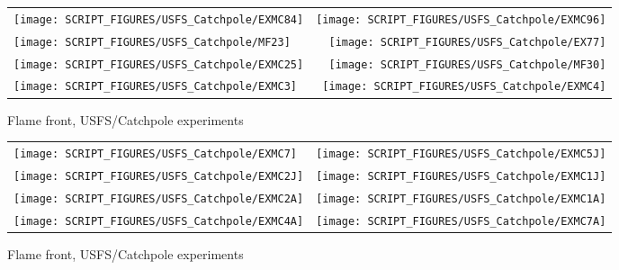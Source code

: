 \begin{figure}[p]
\begin{tabular*}{\textwidth}{l@{\extracolsep{\fill}}r}
\texttt{[image: SCRIPT\_FIGURES/USFS\_Catchpole/EXMC84]} &
\texttt{[image: SCRIPT\_FIGURES/USFS\_Catchpole/EXMC96]} \\
\texttt{[image: SCRIPT\_FIGURES/USFS\_Catchpole/MF23]} &
\texttt{[image: SCRIPT\_FIGURES/USFS\_Catchpole/EX77]} \\
\texttt{[image: SCRIPT\_FIGURES/USFS\_Catchpole/EXMC25]} &
\texttt{[image: SCRIPT\_FIGURES/USFS\_Catchpole/MF30]} \\
\texttt{[image: SCRIPT\_FIGURES/USFS\_Catchpole/EXMC3]} &
\texttt{[image: SCRIPT\_FIGURES/USFS\_Catchpole/EXMC4]} \\
\end{tabular*}
\caption[Flame front, USFS/Catchpole experiments]{Flame front, USFS/Catchpole experiments}
\label{USFS_Catchpole_296}
\end{figure}

\begin{figure}[p]
\begin{tabular*}{\textwidth}{l@{\extracolsep{\fill}}r}
\texttt{[image: SCRIPT\_FIGURES/USFS\_Catchpole/EXMC7]} &
\texttt{[image: SCRIPT\_FIGURES/USFS\_Catchpole/EXMC5J]} \\
\texttt{[image: SCRIPT\_FIGURES/USFS\_Catchpole/EXMC2J]} &
\texttt{[image: SCRIPT\_FIGURES/USFS\_Catchpole/EXMC1J]} \\
\texttt{[image: SCRIPT\_FIGURES/USFS\_Catchpole/EXMC2A]} &
\texttt{[image: SCRIPT\_FIGURES/USFS\_Catchpole/EXMC1A]} \\
\texttt{[image: SCRIPT\_FIGURES/USFS\_Catchpole/EXMC4A]} &
\texttt{[image: SCRIPT\_FIGURES/USFS\_Catchpole/EXMC7A]} \\
\end{tabular*}
\caption[Flame front, USFS/Catchpole experiments]{Flame front, USFS/Catchpole experiments}
\label{USFS_Catchpole_304}
\end{figure}

